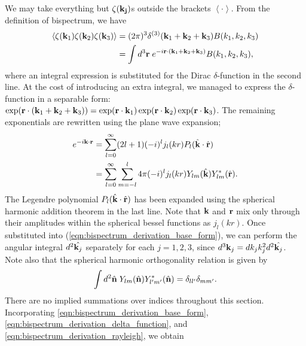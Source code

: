 We may take everything but $\zeta(\mathbf{k_j})$s outside the brackets $\left< \cdot \right>$. From the definition of bispectrum, we have
\begin{align}
	\left< \zeta(\mathbf{k}_1) \zeta(\mathbf{k}_2)  \zeta(\mathbf{k}_3) \right> &= (2\pi)^3 \delta^{(3)}(\mathbf{k}_1 + \mathbf{k}_2 + \mathbf{k}_3) B(k_1, k_2, k_3) \label{eqn:primordial_bispectrum}\\
	&= \int d^3 \mathbf{r} \; e^{-i\mathbf{r} \cdot (\mathbf{k}_1 + \mathbf{k}_2 + \mathbf{k}_3)}  B(k_1, k_2, k_3), \label{eqn:bispectrum_derivation_delta_function}
\end{align}
where an integral expression is substituted for the Dirac $\delta$-function in the second line. At the cost of introducing an extra integral, we managed to express the $\delta$-function in a separable form: $\exp(\mathbf{r} \cdot (\mathbf{k}_1+\mathbf{k}_2+\mathbf{k}_3)) = \exp(\mathbf{r}\cdot \mathbf{k}_1) \exp(\mathbf{r}\cdot \mathbf{k}_2) \exp(\mathbf{r}\cdot \mathbf{k}_3)$. The remaining exponentials are rewritten using the plane wave expansion;
\begin{align}
	e^{-i \mathbf{k} \cdot \mathbf{r}} &= \sum_{l=0}^{\infty} (2l+1) (-i)^l j_l(kr) P_l(\hat{\mathbf{k}} \cdot \hat{\mathbf{r}})  \\	
	&= \sum_{l=0}^{\infty} \sum_{m=-l}^{l} 4\pi (-i)^l j_l(kr) Y_{lm}(\hat{\mathbf{k}}) Y^*_{lm}(\hat{\mathbf{r}}). \label{eqn:bispectrum_derivation_rayleigh}
\end{align}
The Legendre polynomial $P_l(\hat{\mathbf{k}} \cdot \hat{\mathbf{r}})$ has been expanded using the spherical harmonic addition theorem in the last line. Note that $\mathbf{k}$ and $\mathbf{r}$ mix only through their amplitudes within the spherical bessel functions as $j_l(kr)$. Once substituted into (\ref{eqn:bispectrum_derivation_base_form}), we can perform the angular integral $d^2 \hat{\mathbf{k}_j}$ separately for each $j=1,2,3$, since $d^3\mathbf{k}_j = dk_j k_j^2 d^2 \hat{\mathbf{k}_j}$. Note also that the spherical harmonic orthogonality relation is given by
\begin{align}
	\int d^2 \hat{\mathbf{n}} \; Y_{lm}(\hat{\mathbf{n}}) Y^*_{l'm'}(\hat{\mathbf{n}}) = \delta_{l l'} \delta_{m m'}.
\end{align}
There are no implied summations over indices throughout this section. Incorporating \eqref{eqn:bispectrum_derivation_base_form}, \eqref{eqn:bispectrum_derivation_delta_function}, and \eqref{eqn:bispectrum_derivation_rayleigh}, we obtain

